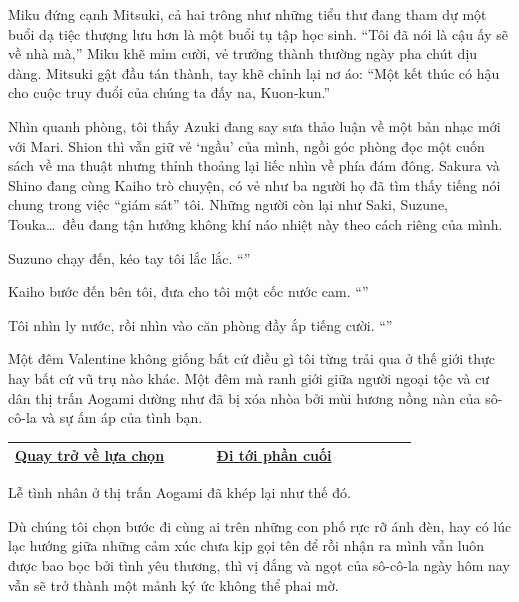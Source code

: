 \documentclass[../main.tex]{subfiles}
\begin{document}
Miku đứng cạnh Mitsuki, cả hai trông như những tiểu thư đang tham dự một buổi dạ tiệc thượng lưu hơn là một buổi tụ tập học sinh. ``Tôi đã nói là cậu ấy sẽ về nhà mà,'' Miku khẽ mỉm cười, vẻ trưởng thành thường ngày pha chút dịu dàng. Mitsuki gật đầu tán thành, tay khẽ chỉnh lại nơ áo: ``Một kết thúc có hậu cho cuộc truy đuổi của chúng ta đấy na, Kuon-kun.''

Nhìn quanh phòng, tôi thấy Azuki đang say sưa thảo luận về một bản nhạc mới với Mari. Shion thì vẫn giữ vẻ `ngầu' của mình, ngồi góc phòng đọc một cuốn sách về ma thuật nhưng thỉnh thoảng lại liếc nhìn về phía đám đông. Sakura và Shino đang cùng Kaiho trò chuyện, có vẻ như ba người họ đã tìm thấy tiếng nói chung trong việc ``giám sát'' tôi. Những người còn lại như Saki, Suzune, Touka\dots\ đều đang tận hưởng không khí náo nhiệt này theo cách riêng của mình.

Suzuno chạy đến, kéo tay tôi lắc lắc. ``''

Kaiho bước đến bên tôi, đưa cho tôi một cốc nước cam. ``''

Tôi nhìn ly nước, rồi nhìn vào căn phòng đầy ắp tiếng cười. ``''

Một đêm Valentine không giống bất cứ điều gì tôi từng trải qua ở thế giới thực hay bất cứ vũ trụ nào khác. Một đêm mà ranh giới giữa người ngoại tộc và cư dân thị trấn Aogami dường như đã bị xóa nhòa bởi mùi hương nồng nàn của sô-cô-la và sự ấm áp của tình bạn.

\ct

\begin{table}[H]
  \centering
  \setlength{\arrayrulewidth}{1pt}
  \begin{tabular}{|>{\centering\arraybackslash}p{0.4\linewidth}|>{\centering\arraybackslash}p{0.4\linewidth}|}
    \hline
    \hyperref[choice]{Quay trở về lựa chọn} & \hyperref[ending]{Đi tới phần cuối} \\ \hline
  \end{tabular}
\end{table}


\newpage
\label{ending}

Lễ tình nhân ở thị trấn Aogami đã khép lại như thế đó.

Dù chúng tôi chọn bước đi cùng ai trên những con phố rực rỡ ánh đèn, hay có lúc lạc hướng giữa những cảm xúc chưa kịp gọi tên để rồi nhận ra mình vẫn luôn được bao bọc bởi tình yêu thương, thì vị đắng và ngọt của sô-cô-la ngày hôm nay vẫn sẽ trở thành một mảnh ký ức không thể phai mờ.
\end{document}
